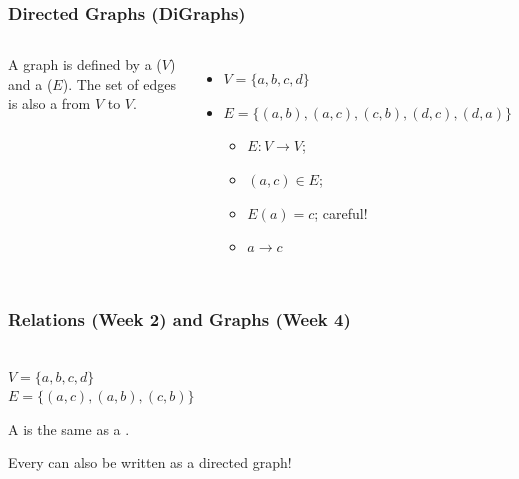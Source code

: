 \documentclass{beamer}
\begin{document}
\begin{frame}
  \frametitle{Directed Graphs (DiGraphs)}

    \begin{columns}
      

      A graph is defined by a  ($V$) and a
       ($E$). The set of edges is also a
       from $V$ to $V$.
      \medskip

      \begin{itemize}
        \item $V = \{a,b,c,d\}$
        \item $E = \{(a,b), (a,c), (c,b), (d,c), (d,a)\}$
          \bigskip

          \begin{itemize}
            \item $E: V\rightarrow V$;
            \item $(a,c) \in E$;
            \item $E(a) = c$; \hspace{1cm} \alert{careful!}
            \item $a \rightarrow c$
          \end{itemize}
      \end{itemize}
    \end{columns}
\end{frame}

\begin{frame}
  \frametitle{Relations (Week 2) and Graphs (Week 4)}

  {\larger

  \begin{center}
  \\
  $V = \{a,b,c,d\}$\\
  $E = \{(a,c),(a,b),(c,b)\}$
  \end{center}

  \vfill

  A  is the same as a
  .

  \bigskip

  Every  can also be written as a directed
  graph!

  }
\end{frame}
\end{document}
